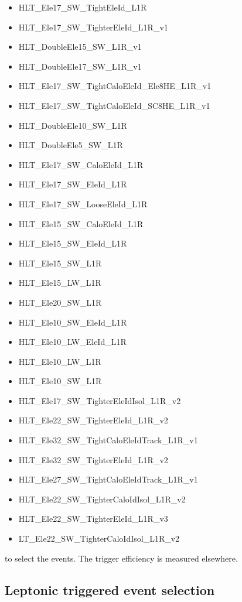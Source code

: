\begin{itemize}
\item HLT\_Ele17\_SW\_TightEleId\_L1R 
\item HLT\_Ele17\_SW\_TighterEleId\_L1R\_v1 
\item HLT\_DoubleEle15\_SW\_L1R\_v1 
\item HLT\_DoubleEle17\_SW\_L1R\_v1 
\item HLT\_Ele17\_SW\_TightCaloEleId\_Ele8HE\_L1R\_v1 
\item HLT\_Ele17\_SW\_TightCaloEleId\_SC8HE\_L1R\_v1 
\item HLT\_DoubleEle10\_SW\_L1R 
\item HLT\_DoubleEle5\_SW\_L1R 
\item HLT\_Ele17\_SW\_CaloEleId\_L1R 
\item HLT\_Ele17\_SW\_EleId\_L1R 
\item HLT\_Ele17\_SW\_LooseEleId\_L1R 
\item HLT\_Ele15\_SW\_CaloEleId\_L1R 
\item HLT\_Ele15\_SW\_EleId\_L1R 
\item HLT\_Ele15\_SW\_L1R 
\item HLT\_Ele15\_LW\_L1R 
\item HLT\_Ele20\_SW\_L1R 
\item HLT\_Ele10\_SW\_EleId\_L1R 
\item HLT\_Ele10\_LW\_EleId\_L1R 
\item HLT\_Ele10\_LW\_L1R 
\item HLT\_Ele10\_SW\_L1R 
\item HLT\_Ele17\_SW\_TighterEleIdIsol\_L1R\_v2 
\item HLT\_Ele22\_SW\_TighterEleId\_L1R\_v2 
\item HLT\_Ele32\_SW\_TightCaloEleIdTrack\_L1R\_v1 
\item HLT\_Ele32\_SW\_TighterEleId\_L1R\_v2 
\item HLT\_Ele27\_SW\_TightCaloEleIdTrack\_L1R\_v1 
\item HLT\_Ele22\_SW\_TighterCaloIdIsol\_L1R\_v2 
\item HLT\_Ele22\_SW\_TighterEleId\_L1R\_v3 
\item LT\_Ele22\_SW\_TighterCaloIdIsol\_L1R\_v2
\end{itemize}
to select the events. 
The trigger efficiency is measured elsewhere.

\subsection{Leptonic triggered event selection}

